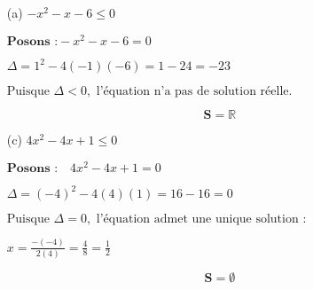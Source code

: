 \documentclass[12pt,a4paper]{article}
\begin{document}
\begin{enumerate}
    \item[(a)] \( -x^2 - x - 6 \leq 0 \) 

\(
\textbf{Posons :} -x^2 - x - 6 = 0 
\)

\(
\Delta = 1^2 - 4(-1)(-6) = 1 - 24 = -23
\)

\(
\text{Puisque } \Delta < 0, \text{ l'équation n'a pas de solution réelle.}
\)

\begin{center}


\end{center}

\begin{tcolorbox}[colback=yellow!20, colframe=black, sharp corners]
    \[
    \mathbf{S = \mathbb{R}}
    \]
\end{tcolorbox}

    \item[(c)] \( 4x^2 - 4x + 1 \leq 0 \) 
    
\(
\textbf{Posons :} \quad 4x^2 - 4x + 1 = 0
\)

\(
\Delta = (-4)^2 - 4(4)(1) = 16 - 16 = 0
\)

\(
\text{Puisque } \Delta = 0, \text{ l'équation admet une unique solution :}
\)

\(
x = \frac{-(-4)}{2(4)} = \frac{4}{8} = \frac{1}{2}
\)

\begin{center}
\end{center}

\begin{tcolorbox}[colback=yellow!20, colframe=black, sharp corners]
    \[
    \mathbf{S = \emptyset}
    \]
\end{tcolorbox}

\end{enumerate}
\end{document}
